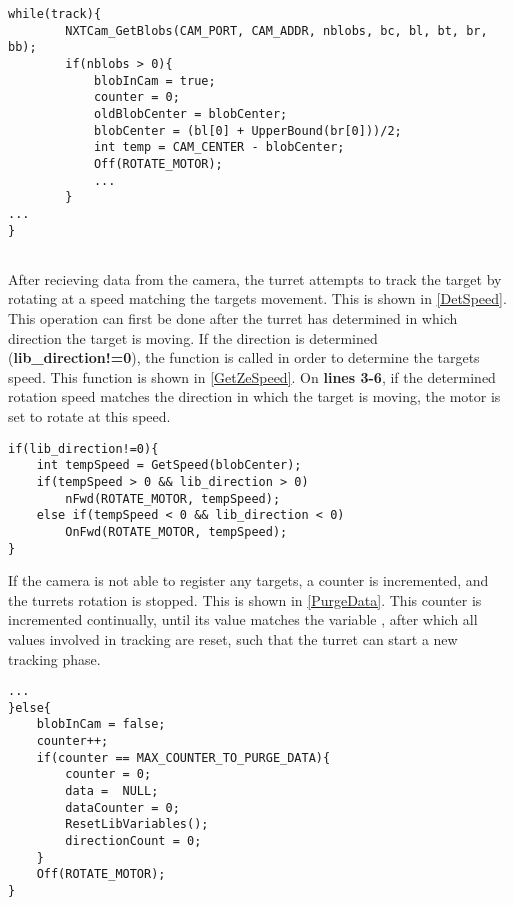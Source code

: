 \begin{minipage}[H]{\linewidth}
\begin{lstlisting}[caption = First part of the general tracking behaviour., label = TrackFirst] 
while(track){        
        NXTCam_GetBlobs(CAM_PORT, CAM_ADDR, nblobs, bc, bl, bt, br, bb);
        if(nblobs > 0){
            blobInCam = true;
            counter = 0;
            oldBlobCenter = blobCenter;
            blobCenter = (bl[0] + UpperBound(br[0]))/2;
            int temp = CAM_CENTER - blobCenter;
            Off(ROTATE_MOTOR);
            ...
        }
...
}        
            
\end{lstlisting}
\end{minipage}

After recieving data from the camera, the turret attempts to track the target by
rotating at a speed matching the targets movement. This is shown in
\autoref{DetSpeed}. This operation can first be done after the turret has
determined in which direction the target is moving. If the direction is
determined (\textbf{lib\_direction!=0}), the  function
is called in order to determine the targets speed. This function is shown in \autoref{GetZeSpeed}.
On \textbf{lines 3-6}, if the determined rotation speed matches the direction in
which the target is moving, the motor is set to rotate at this speed.\nl

\begin{minipage}[H]{\linewidth}
\begin{lstlisting}[caption = Determine the targets speed at rotate to match it, label = DetSpeed] 
if(lib_direction!=0){
	int tempSpeed = GetSpeed(blobCenter);
	if(tempSpeed > 0 && lib_direction > 0)
		nFwd(ROTATE_MOTOR, tempSpeed);
	else if(tempSpeed < 0 && lib_direction < 0)
		OnFwd(ROTATE_MOTOR, tempSpeed);
}
\end{lstlisting}
\end{minipage}

If the camera is not able to register any targets, a counter is incremented, and
the turrets rotation is stopped. This is shown in \autoref{PurgeData}. This
counter is incremented continually, until its value matches the variable
, after which all values involved
in tracking are reset, such that the turret can start a new tracking phase.\nl

\begin{minipage}[H]{\linewidth}
\begin{lstlisting}[caption = Reset data and turn off motor is no targets are found., label = PurgeData] 
...
}else{
	blobInCam = false;
    counter++;
    if(counter == MAX_COUNTER_TO_PURGE_DATA){
    	counter = 0;
        data =  NULL;
        dataCounter = 0;
        ResetLibVariables();
        directionCount = 0;
    }
    Off(ROTATE_MOTOR);
}
\end{lstlisting}
\end{minipage}

